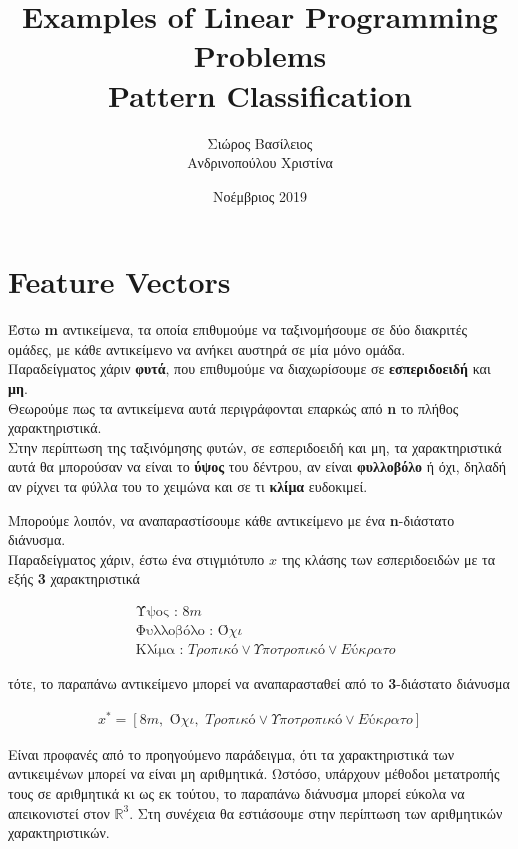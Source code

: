 \documentclass[12pt]{article}
\title{\huge Examples of Linear Programming Problems\\Pattern Classification}
\author{Σιώρος Βασίλειος\\Ανδρινοπούλου Χριστίνα}
\date{Νοέμβριος 2019}
\newcommand{\R}{\mathbb{R}}
\newcommand{\margin}{\hspace{4pt}}
\newcommand{\centered}[1]{\begin{align*}#1\end{align*}}
\begin{document}
\maketitle


\pagebreak

\section{Feature Vectors}

Έστω \textbf{m} αντικείμενα, τα οποία επιθυμούμε να ταξινομήσουμε σε δύο διακριτές ομάδες,
με κάθε αντικείμενο να ανήκει αυστηρά σε μία μόνο ομάδα. \\

Παραδείγματος χάριν \textbf{φυτά}, που επιθυμούμε να διαχωρίσουμε σε \textbf{εσπεριδοειδή} και \textbf{μη}.\\

Θεωρούμε πως τα αντικείμενα αυτά περιγράφονται επαρκώς από \textbf{n} το πλήθος χαρακτηριστικά. \\

Στην περίπτωση της ταξινόμησης φυτών, σε εσπεριδοειδή και μη, τα χαρακτηριστικά αυτά θα μπορούσαν
να είναι το \textbf{ύψος} του δέντρου, αν είναι \textbf{φυλλοβόλο} ή όχι, δηλαδή αν ρίχνει τα φύλλα του το χειμώνα και σε τι \textbf{κλίμα} ευδοκιμεί.

Μπορούμε λοιπόν, να αναπαραστίσουμε κάθε αντικείμενο με ένα \textbf{n}-διάστατο διάνυσμα. \\

Παραδείγματος χάριν, έστω ένα στιγμιότυπο \(x\) της κλάσης των εσπεριδοειδών με τα εξής \textbf{3} χαρακτηριστικά

\begin{align*}
    &\text{Ύψος : } \textit{8m} \\
    &\text{Φυλλοβόλο : } \textit{Όχι} \\
    &\text{Κλίμα : } \textit{Τροπικό} \vee \textit{Υποτροπικό} \vee \textit{Eύκρατο}
\end{align*}

τότε, το παραπάνω αντικείμενο μπορεί να αναπαρασταθεί από το \textbf{3}-διάστατο διάνυσμα

\centered{x^* = [\textit{8m}, \margin \textit{Όχι}, \margin \textit{Τροπικό} \vee \textit{Υποτροπικό} \vee \textit{Eύκρατο}]}

Είναι προφανές από το προηγούμενο παράδειγμα, ότι τα χαρακτηριστικά των αντικειμένων μπορεί να είναι μη αριθμητικά.
Ωστόσο, υπάρχουν μέθοδοι μετατροπής τους σε αριθμητικά κι ως εκ τούτου, το παραπάνω διάνυσμα μπορεί εύκολα να απεικονιστεί στον \( \R^{3} \).
Στη συνέχεια θα εστιάσουμε στην περίπτωση των αριθμητικών χαρακτηριστικών. \\
\end{document}
